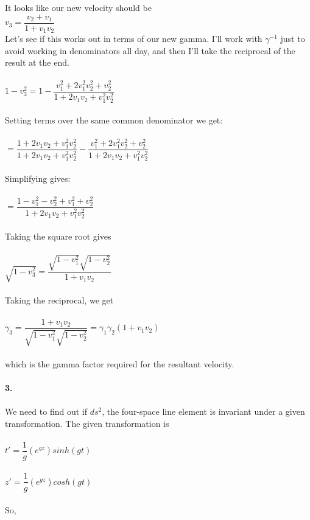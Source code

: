 \documentclass[prb,preprint]
{revtex4-1}
\newcommand{\PRLsep}{\noindent\makebox[\linewidth]{\resizebox{0.8888\linewidth}{2pt}{$\bullet$}}\bigskip}
\begin{document}
It looks like our new velocity should be 
\\
$v_3 = \dfrac{v_2 + v_1}{1 + v_1 v_2}$
\\
Let's see if this works out in terms of our new gamma.  I'll work with $\gamma^{-1}$ just to avoid working in denominators all day, and then I'll take the reciprocal of the result at the end.
\\
\\
$1 - v_3^2 = 1 - \dfrac{v_1^2 + 2v_1^2 v_2^2 + v_2^2}{1 + 2 v_1 v_2 + v_1^2 v_2^2}$
\\
\\
Setting terms over the same common denominator we get:
\\
\\
$= \dfrac{1 + 2 v_1 v_2 + v_1^2 v_2^2}{1 + 2 v_1 v_2 + v_1^2 v_2^2} - \dfrac{v_1^2 + 2v_1^2 v_2^2 + v_2^2}{1 + 2 v_1 v_2 + v_1^2 v_2^2}$
\\
\\
Simplifying gives:
\\
\\
$= \dfrac{1 - v_1^2 - v_2^2 + v_1^2 + v_2^2}{1 + 2 v_1 v_2 + v_1^2 v_2^2}$
\\
\\
Taking the square root gives
\\
\\
$\sqrt{1 - v_3^2} = \dfrac{\sqrt{1-v_1^2}\sqrt{1-v_2^2}}{1+ v_1 v_2}$
\\
\\
Taking the reciprocal, we get 
\\
\\
$\gamma_3 = \dfrac{1+ v_1 v_2}{\sqrt{1-v_1^2}\sqrt{1-v_2^2}} = \gamma_1 \gamma_2 \left(1+ v_1 v_2\right)$
\\
\\
which is the gamma factor required for the resultant velocity.
\\
\PRLsep
\\
\textbf{3.}
\\
\\
We need to find out if $ds^2$, the four-space line element is invariant under a given transformation.
The given transformation is 
\\
\\
$t' = \dfrac{1}{g}\left(e^{gz}\right)sinh\left(gt\right)$
\\
\\
$z' = \dfrac{1}{g}\left(e^{gz}\right)cosh\left(gt\right)$
\\
\\
So,
\\
\end{document}
